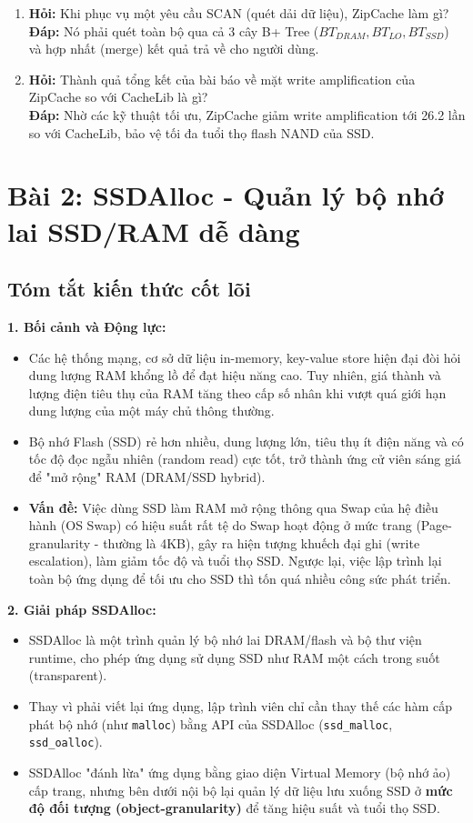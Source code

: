 \documentclass[12pt,a4paper]{article}
\begin{document}
\begin{enumerate}
    \item \textbf{Hỏi:} Khi phục vụ một yêu cầu SCAN (quét dải dữ liệu), ZipCache làm gì? \\
    \textbf{Đáp:} Nó phải quét toàn bộ qua cả 3 cây B+ Tree ($BT_{DRAM}, BT_{LO}, BT_{SSD}$) và hợp nhất (merge) kết quả trả về cho người dùng.
    
    \item \textbf{Hỏi:} Thành quả tổng kết của bài báo về mặt write amplification của ZipCache so với CacheLib là gì? \\
    \textbf{Đáp:} Nhờ các kỹ thuật tối ưu, ZipCache giảm write amplification tới 26.2 lần so với CacheLib, bảo vệ tối đa tuổi thọ flash NAND của SSD.
\end{enumerate}

\newpage
\section{Bài 2: SSDAlloc - Quản lý bộ nhớ lai SSD/RAM dễ dàng}

\subsection{Tóm tắt kiến thức cốt lõi}

\textbf{1. Bối cảnh và Động lực:}
\begin{itemize}
    \item Các hệ thống mạng, cơ sở dữ liệu in-memory, key-value store hiện đại đòi hỏi dung lượng RAM khổng lồ để đạt hiệu năng cao. Tuy nhiên, giá thành và lượng điện tiêu thụ của RAM tăng theo cấp số nhân khi vượt quá giới hạn dung lượng của một máy chủ thông thường.
    \item Bộ nhớ Flash (SSD) rẻ hơn nhiều, dung lượng lớn, tiêu thụ ít điện năng và có tốc độ đọc ngẫu nhiên (random read) cực tốt, trở thành ứng cử viên sáng giá để "mở rộng" RAM (DRAM/SSD hybrid).
    \item \textbf{Vấn đề:} Việc dùng SSD làm RAM mở rộng thông qua Swap của hệ điều hành (OS Swap) có hiệu suất rất tệ do Swap hoạt động ở mức trang (Page-granularity - thường là 4KB), gây ra hiện tượng khuếch đại ghi (write escalation), làm giảm tốc độ và tuổi thọ SSD. Ngược lại, việc lập trình lại toàn bộ ứng dụng để tối ưu cho SSD thì tốn quá nhiều công sức phát triển.
\end{itemize}

\textbf{2. Giải pháp SSDAlloc:}
\begin{itemize}
    \item SSDAlloc là một trình quản lý bộ nhớ lai DRAM/flash và bộ thư viện runtime, cho phép ứng dụng sử dụng SSD như RAM một cách trong suốt (transparent).
    \item Thay vì phải viết lại ứng dụng, lập trình viên chỉ cần thay thế các hàm cấp phát bộ nhớ (như \texttt{malloc}) bằng API của SSDAlloc (\texttt{ssd\_malloc}, \texttt{ssd\_oalloc}).
    \item SSDAlloc "đánh lừa" ứng dụng bằng giao diện Virtual Memory (bộ nhớ ảo) cấp trang, nhưng bên dưới nội bộ lại quản lý dữ liệu lưu xuống SSD ở \textbf{mức độ đối tượng (object-granularity)} để tăng hiệu suất và tuổi thọ SSD.
\end{itemize}
\end{document}

